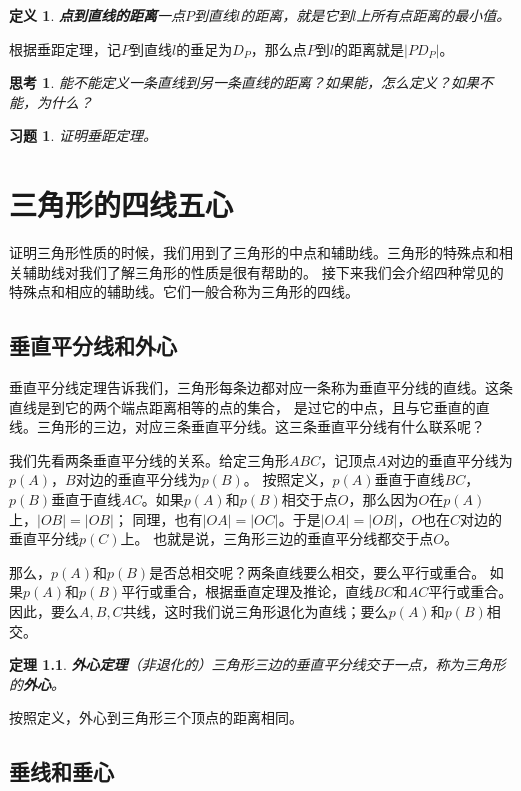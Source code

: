 \documentclass[12pt,UTF8]{ctexbook}
\newtheorem{df}{定义}[section]
\newtheorem{tm}{定理}[section]
\newtheorem{sk}{思考}[section]
\newtheorem{xt}{习题}[section]
\begin{document}
\begin{df}{\textbf{点到直线的距离}}\label{df:0-2-0}
    一点$P$到直线$l$的距离，就是它到$l$上所有点距离的最小值。
\end{df}
根据垂距定理，记$P$到直线$l$的垂足为$D_P$，那么点$P$到$l$的距离就是$|PD_P|$。

\begin{sk}\label{sk:0-2-0}
    能不能定义一条直线到另一条直线的距离？如果能，怎么定义？如果不能，为什么？
\end{sk}

\begin{xt}\label{xt:0-2-0} 证明垂距定理。
\end{xt}


\chapter{三角形的四线五心}
证明三角形性质的时候，我们用到了三角形的中点和辅助线。三角形的特殊点和相关辅助线对我们了解三角形的性质是很有帮助的。
接下来我们会介绍四种常见的特殊点和相应的辅助线。它们一般合称为三角形的四线。

\section{垂直平分线和外心}
垂直平分线定理告诉我们，三角形每条边都对应一条称为垂直平分线的直线。这条直线是到它的两个端点距离相等的点的集合，
是过它的中点，且与它垂直的直线。三角形的三边，对应三条垂直平分线。这三条垂直平分线有什么联系呢？

我们先看两条垂直平分线的关系。给定三角形$ABC$，记顶点$A$对边的垂直平分线为$p(A)$，$B$对边的垂直平分线为$p(B)$。
按照定义，$p(A)$垂直于直线$BC$，$p(B)$垂直于直线$AC$。如果$p(A)$和$p(B)$相交于点$O$，那么因为$O$在$p(A)$上，$|OB| = |OB|$；
同理，也有$|OA| = |OC|$。于是$|OA| = |OB|$，$O$也在$C$对边的垂直平分线$p(C)$上。
也就是说，三角形三边的垂直平分线都交于点$O$。

那么，$p(A)$和$p(B)$是否总相交呢？两条直线要么相交，要么平行或重合。
如果$p(A)$和$p(B)$平行或重合，根据垂直定理及推论，直线$BC$和$AC$平行或重合。
因此，要么$A,B,C$共线，这时我们说三角形退化为直线；要么$p(A)$和$p(B)$相交。
\begin{tm}{\textbf{外心定理}}\label{tm:1-0-0}
    （非退化的）三角形三边的垂直平分线交于一点，称为三角形的\textbf{外心}。
\end{tm}
按照定义，外心到三角形三个顶点的距离相同。

\section{垂线和垂心}
\end{document}
